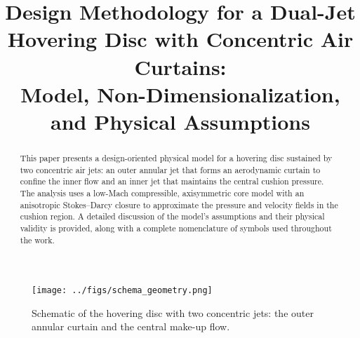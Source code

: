 \documentclass[11pt,a4paper]{article}
\title{Design Methodology for a Dual-Jet Hovering Disc with Concentric Air Curtains:\\
Model, Non-Dimensionalization, and Physical Assumptions}
\author{ }
\date{ }
\begin{document}
\maketitle

\begin{abstract}
This paper presents a design-oriented physical model for a hovering disc sustained by two concentric air jets:
an outer annular jet that forms an aerodynamic curtain to confine the inner flow and an inner jet that maintains the central cushion pressure.
The analysis uses a low-Mach compressible, axisymmetric core model with an anisotropic Stokes--Darcy closure to approximate the pressure and velocity fields in the cushion region.
A detailed discussion of the model's assumptions and their physical validity is provided, along with a complete nomenclature of symbols used throughout the work.
\end{abstract}

\begin{figure}[t]
  \centering
  \texttt{[image: ../figs/schema\_geometry.png]}
  \caption{Schematic of the hovering disc with two concentric jets: the outer annular curtain and the central make-up flow.}
  \label{fig:geometry}
\end{figure}
\end{document}

